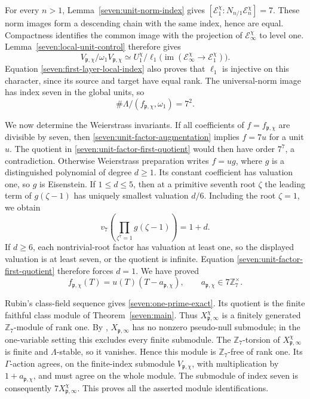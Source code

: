 For every $n>1$, Lemma~\ref{seven:unit-norm-index} gives
$[\mathcal E_1^\chi:N_{n/1}\mathcal E_n^\chi]=7$.
These norm images form a descending chain with the same index, hence
are equal. Compactness identifies the common image with the
projection of $\mathcal E_\infty^\chi$ to level one.
Lemma~\ref{seven:local-unit-control} therefore gives
\[
 V_{\mathfrak p,\chi}/\omega_1V_{\mathfrak p,\chi}
 \simeq
 U_1^\chi/
 \ell_1\bigl(\operatorname{im}
       (\mathcal E_\infty^\chi\to\mathcal E_1^\chi)\bigr).
\]
Equation \eqref{seven:first-layer-local-index} also proves that
$\ell_1$ is injective on this character, since its source and target
have equal rank. The universal-norm image has index seven in the
global units, so
\begin{equation*}\tag{U16}\label{seven:unit-factor-first-quotient}
 \#\Lambda/(f_{\mathfrak p,\chi},\omega_1)=7^2.
\end{equation*}

We now determine the Weierstrass invariants. If all coefficients of
$f=f_{\mathfrak p,\chi}$ are divisible by seven, then
\eqref{seven:unit-factor-augmentation} implies $f=7u$ for a unit $u$.
The quotient in \eqref{seven:unit-factor-first-quotient} would then
have order $7^7$, a contradiction. Otherwise Weierstrass preparation
writes $f=ug$, where $g$ is a distinguished polynomial of degree
$d\ge1$. Its constant coefficient has valuation one, so $g$ is
Eisenstein. If $1\le d\le5$, then at a primitive seventh root
$\zeta$ the leading term of $g(\zeta-1)$ has uniquely smallest
valuation $d/6$. Including the root $\zeta=1$, we obtain
\[
 v_7\!\left(\prod_{\zeta^7=1}g(\zeta-1)\right)=1+d.
\]
If $d\ge6$, each nontrivial-root factor has valuation at least one,
so the displayed valuation is at least seven, or the quotient is
infinite. Equation \eqref{seven:unit-factor-first-quotient} therefore
forces $d=1$. We have proved
\[
 f_{\mathfrak p,\chi}(T)
 =u(T)(T-a_{\mathfrak p,\chi}),\qquad
 a_{\mathfrak p,\chi}\in7\mathbb Z_7^\times.
\]

Rubin's class-field sequence
\cite[printed p.~36, equation~(5)]{Rubin} gives
\eqref{seven:one-prime-exact}. Its quotient is the finite faithful
class module of Theorem~\ref{seven:main}. Thus
$X_{\mathfrak p,\infty}^\chi$ is a finitely generated
$\mathbb Z_7$-module of rank one.
By \cite[Theorem~5.3(v), printed pp.~40--41]{Rubin},
$X_{\mathfrak p,\infty}$ has no nonzero pseudo-null submodule;
in the one-variable setting this excludes every finite submodule.
The $\mathbb Z_7$-torsion of $X_{\mathfrak p,\infty}^\chi$ is finite
and $\Lambda$-stable, so it vanishes. Hence this module is
$\mathbb Z_7$-free of rank one. Its $\Gamma$-action agrees, on the
finite-index submodule $V_{\mathfrak p,\chi}$, with multiplication
by $1+a_{\mathfrak p,\chi}$, and must agree on the whole module.
The submodule of index seven is consequently
$7X_{\mathfrak p,\infty}^\chi$. This proves all the asserted module
identifications.


